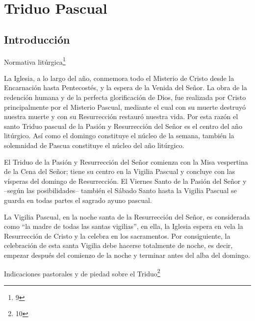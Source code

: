 			\part{Triduo Pascual}
			
			\chapter{Introducción}
			
			\begin{introsection}Normativa litúrgica\footnote{9}\end{introsection}
			
			\begin{bodyintro}La Iglesia, a lo largo del año, conmemora todo el Misterio de Cristo desde la Encarnación hasta Pentecostés, y la espera de la Venida del Señor. La obra de la redención humana y de la perfecta glorificación de Dios, fue realizada por Cristo principalmente por el Misterio Pascual, mediante el cual con su muerte destruyó nuestra muerte y con su Resurrección restauró nuestra vida. Por esta razón el santo Triduo pascual de la Pasión y Resurrección del Señor es el centro del año litúrgico. Así como el domingo constituye el núcleo de la semana, también la solemnidad de Pascua constituye el núcleo del año litúrgico.\end{bodyintro}
			
			\begin{bodyintro}El Triduo de la Pasión y Resurrección del Señor comienza con la Misa vespertina de la Cena del Señor; tiene su centro en la Vigilia Pascual y concluye con las vísperas del domingo de Resurrección. El Viernes Santo de la Pasión del Señor y –según las posibilidades– también el Sábado Santo hasta la Vigilia Pascual se guarda en todas partes el sagrado ayuno pascual. \end{bodyintro}
			
			\begin{bodyintro}La Vigilia Pascual, en la noche santa de la Resurrección del Señor, es considerada como “la madre de todas las santas vigilias”, en ella, la Iglesia espera en vela la Resurrección de Cristo y la celebra en los sacramentos. Por consiguiente, la celebración de esta santa Vigilia debe hacerse totalmente de noche, es decir, empezar después del comienzo de la noche y terminar antes del alba del domingo. \end{bodyintro}
			
			\begin{introsection}Indicaciones pastorales y de piedad sobre el Triduo\footnote{10}\end{introsection}
			
